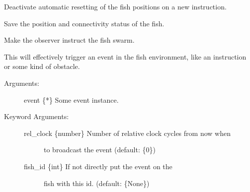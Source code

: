 \documentclass[letterpaper,10pt,english]{sphinxmanual}
\begin{document}
\begin{fulllineitems}
\begin{fulllineitems}
\end{fulllineitems}


\begin{fulllineitems}
\label{\detokenize{index:observer.Observer.deactivate_reset}}
Deactivate automatic resetting of the fish positions on a new
instruction.

\end{fulllineitems}


\begin{fulllineitems}
\label{\detokenize{index:observer.Observer.eval}}
Save the position and connectivity status of the fish.

\end{fulllineitems}


\begin{fulllineitems}
\label{\detokenize{index:observer.Observer.instruct}}
Make the observer instruct the fish swarm.

This will effectively trigger an event in the fish environment, like an
instruction or some kind of obstacle.
\begin{description}
\item[{Arguments:}] \leavevmode
event \{*\} \textendash{} Some event instance.

\item[{Keyword Arguments:}] \leavevmode\begin{description}
\item[{rel\_clock \{number\} \textendash{} Number of relative clock cycles from now when}] \leavevmode
to broadcast the event (default: \{0\})

\item[{fish\_id \{int\} \textendash{} If not  directly put the event on the}] \leavevmode
fish with this id. (default: \{None\})


\end{description}
\end{description}
\end{fulllineitems}
\end{fulllineitems}
\end{document}
